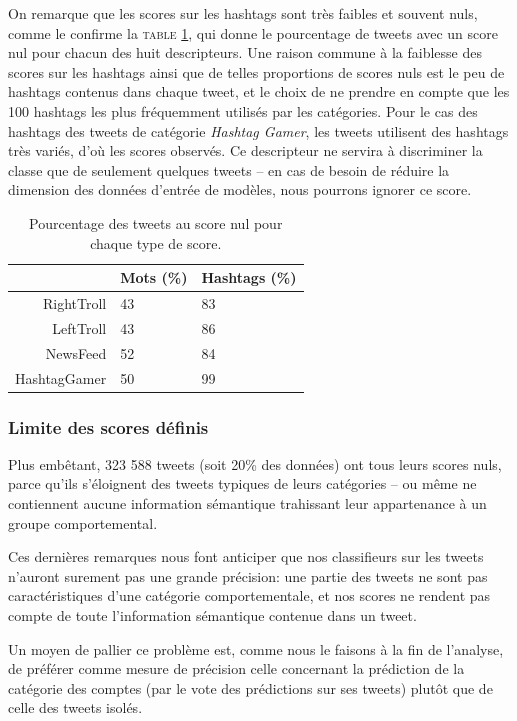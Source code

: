 \documentclass[twocolumn,10pt]{article}
\begin{document}
On remarque que les scores sur les hashtags sont très faibles et souvent nuls, comme le confirme la \textsc{table} \ref{tab:PTSN}, qui donne le pourcentage de tweets avec un score nul pour chacun des huit descripteurs. Une raison commune à la faiblesse des scores sur les hashtags ainsi que de telles proportions de scores nuls est le peu de hashtags contenus dans chaque tweet, et le choix de ne prendre en compte que les 100 hashtags les plus fréquemment utilisés par les catégories. Pour le cas des hashtags des tweets de catégorie \textit{Hashtag Gamer}, les tweets utilisent des hashtags très variés, d'où les scores observés. Ce descripteur ne servira à discriminer la classe que de seulement quelques tweets -- en cas de besoin de réduire la dimension des données d'entrée de modèles, nous pourrons ignorer ce score.


\begin{table}[htbp]
\begin{center}
\noindent\begin{tabular}{r|ll}
 & Mots (\%) & Hashtags (\%)\\ 
\hline 
RightTroll & 43 & 83 \\
LeftTroll & 43 & 86 \\
NewsFeed & 52 & 84 \\
HashtagGamer & 50 & 99 \\
\end{tabular}
\caption{\label{tab:PTSN} Pourcentage des tweets au score nul pour chaque type de score.}
\end{center} 
\end{table}

\subsubsection{Limite des scores définis}\label{sec:limitescores}

Plus embêtant, 323 588 tweets (soit 20\% des données) ont tous leurs scores nuls, parce qu'ils s'éloignent des tweets typiques de leurs catégories -- ou même ne contiennent aucune information sémantique trahissant leur appartenance à un groupe comportemental.

Ces dernières remarques nous font anticiper que nos classifieurs sur les tweets n'auront surement pas une grande précision: une partie des tweets ne sont pas caractéristiques d'une catégorie comportementale, et nos scores ne rendent pas compte de toute l'information sémantique contenue dans un tweet.

Un moyen de pallier ce problème est, comme nous le faisons à la fin de l'analyse, de préférer comme mesure de précision celle concernant la prédiction de la catégorie des comptes (par le vote des prédictions sur ses tweets) plutôt que de celle des tweets isolés.
\end{document}

